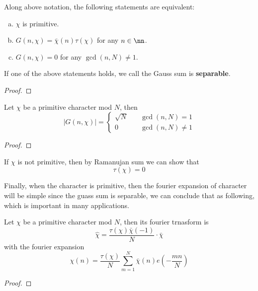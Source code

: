 \begin{lemma}
    Along above notation, the following statements are equivalent:
    \begin{enumerate} [(a)]
    \item \(\chi\) is primitive.
    \item \(G(n,\chi) = \bar{\chi}(n) \tau(\chi)\) for any \(n \in \nn\).
    \item \(G(n,\chi) = 0\) for any \(\gcd(n,N) \neq 1\).
    \end{enumerate}
    If one of the above statements holds, we call the Gauss sum is \textbf{separable}.
\end{lemma}
\begin{proof}
    
\end{proof}

\begin{proposition}
    Let \(\chi\) be a primitive character mod \(N\), then
    \[|G(n,\chi)| = \begin{cases}
        \sqrt{N} \quad &\gcd(n,N) = 1 \\
        0 \quad &\gcd(n,N) \neq 1
    \end{cases}\]
\end{proposition}

\begin{proof}
    
\end{proof}

\begin{remark}
    If \(\chi\) is not primitive, then by Ramanujan sum we can show that 
    \[\tau(\chi) = 0\]
\end{remark}

Finally, when the character is primitive, then the fourier expansion of character will be simple since the guass sum is separable, we can conclude that as following, which is important in many applications.

\begin{colortheorem}
    Let \(\chi\) be a primitive character mod \(N\), then its fourier trnasform is 
    \[\hat{\chi} = \frac{\tau(\chi) \bar{\chi}(-1)}{N} \cdot \bar{\chi}\]
    with the fourier expansion
    \[\chi(n) = \frac{\tau(\chi)}{N} \sum_{m = 1}^N \bar{\chi}(n) e(-\frac{mn}{N})\]
\end{colortheorem}

\begin{proof}
    
\end{proof}

